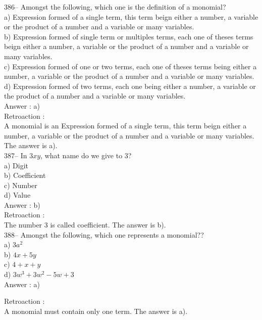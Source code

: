 ﻿\documentclass[letterpaper, 12pt]{article}
\begin{document}
386-- Amongst the following, which one is the definition of a monomial?\\
a) Expression formed of a single term, this term beign either a number, a variable or the product of a number and a variable or many variables.\\
b) Expression formed of single term or multiples terms, each one of theses terms beign either a number, a variable or the product of a number and a variable or many variables.\\
c) Expression formed of one or two terms, each one of theses terms being either a number, a variable or the product of a number and a variable or many variables.\\
d) Expression formed of two terms, each one being either a number, a variable or the product of a number and a variable or many variables.\\

Answer : a)\\

Retroaction : \\
A monomial is an Expression formed of a single term, this term beign either a number, a variable or the product of a number and a variable or many variables.  The answer is a).\\

387--  In $3xy$, what name do we give to 3?\\
a) Digit\\
b) Coefficient\\
c) Number\\
d) Value\\

Answer : b)\\

Retroaction : \\
The number 3 is called coefficient.  The answer is b).\\

388-- Amongst the following, which one represents a monomial??\\
a) $3a^{2}$\\
b) $4x+5y$\\
c) $4+x+y$\\
d) $3w^{3}+3w^{2}-5w+3$\\

Answer : a)

Retroaction : \\
A monomial must contain only one term. The answer is a).\\
\end{document}
